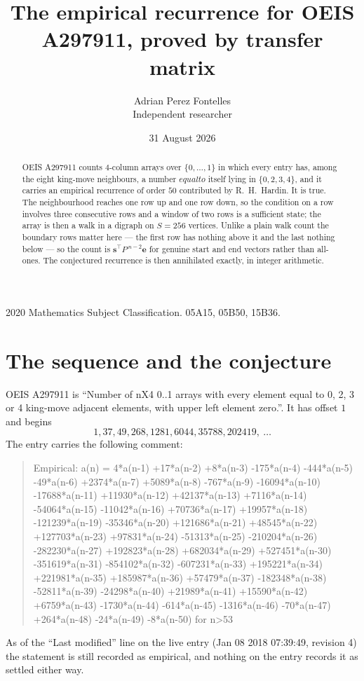 \documentclass[11pt,a4paper]{article}
\title{The empirical recurrence for OEIS A297911, proved by transfer matrix}
\author{Adrian Perez Fontelles\\ \small Independent researcher}
\date{31 August 2026}
\theoremstyle{plain}
\theoremstyle{definition}
\begin{document}
\maketitle

\begin{abstract}
OEIS A297911 counts $4$-column arrays over $\{0,\dots,1\}$ in which every entry has,
among the eight king-move neighbours, a number $equal to$ itself lying in $\{0,2,3,4\}$, and it carries an empirical
recurrence of order $50$ contributed by R.~H.~Hardin. It is true. The neighbourhood
reaches one row up and one row down, so the condition on a row involves three consecutive
rows and a window of two rows is a sufficient state; the array is then a walk in a digraph
on $S=256$ vertices. Unlike a plain walk count the boundary rows matter here --- the first
row has nothing above it and the last nothing below --- so the count is
$\mathbf{s}^{\!\top}P^{\,n-2}\mathbf{e}$ for genuine start and end vectors rather than
all-ones. The conjectured recurrence is then annihilated exactly, in integer arithmetic.
\end{abstract}

\noindent\small 2020 Mathematics Subject Classification. 05A15, 05B50, 15B36.\normalsize

\section{The sequence and the conjecture}

OEIS A297911 is ``Number of nX4 0..1 arrays with every element equal to 0, 2, 3 or 4 king-move adjacent elements, with upper left element zero.''. It has offset
$1$ and begins
\[
1, 37, 49, 268, 1281, 6044, 35788, 202419,\ \dots
\]
The entry carries the following comment:
\begin{quote}\small
Empirical: a(n) = 4*a(n-1) +17*a(n-2) +8*a(n-3) -175*a(n-4) -444*a(n-5) -49*a(n-6) +2374*a(n-7) +5089*a(n-8) -767*a(n-9) -16094*a(n-10) -17688*a(n-11) +11930*a(n-12) +42137*a(n-13) +7116*a(n-14) -54064*a(n-15) -11042*a(n-16) +70736*a(n-17) +19957*a(n-18) -121239*a(n-19) -35346*a(n-20) +121686*a(n-21) +48545*a(n-22) +127703*a(n-23) +97831*a(n-24) -51313*a(n-25) -210204*a(n-26) -282230*a(n-27) +192823*a(n-28) +682034*a(n-29) +527451*a(n-30) -351619*a(n-31) -854102*a(n-32) -607231*a(n-33) +195221*a(n-34) +221981*a(n-35) +185987*a(n-36) +57479*a(n-37) -182348*a(n-38) -52811*a(n-39) -24298*a(n-40) +21989*a(n-41) +15590*a(n-42) +6759*a(n-43) -1730*a(n-44) -614*a(n-45) -1316*a(n-46) -70*a(n-47) +264*a(n-48) -24*a(n-49) -8*a(n-50) for n>53
\end{quote}
As of the ``Last modified'' line on the live entry (Jan 08 2018 07:39:49, revision
4) the statement is still recorded as empirical, and nothing on the entry
records it as settled either way.
\end{document}
